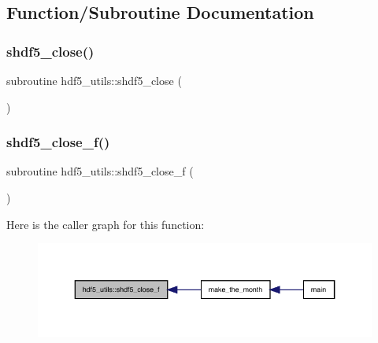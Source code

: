 \subsection{Function/\+Subroutine Documentation}
\mbox{\label{namespacehdf5__utils_ac2a5ad4876fe382625c40cd9964ca3c1}} 
\subsubsection{\texorpdfstring{shdf5\+\_\+close()}{shdf5\_close()}}
{\footnotesize\ttfamily subroutine hdf5\+\_\+utils\+::shdf5\+\_\+close (\begin{DoxyParamCaption}{ }\end{DoxyParamCaption})}

\mbox{\label{namespacehdf5__utils_aced9a0b34d2b1e59a1867be622a7c8a4}} 
\subsubsection{\texorpdfstring{shdf5\+\_\+close\+\_\+f()}{shdf5\_close\_f()}}
{\footnotesize\ttfamily subroutine hdf5\+\_\+utils\+::shdf5\+\_\+close\+\_\+f (\begin{DoxyParamCaption}{ }\end{DoxyParamCaption})}

Here is the caller graph for this function\+:
\nopagebreak
\begin{figure}[H]
\begin{center}
\leavevmode
\includegraphics[width=350pt]{namespacehdf5__utils_aced9a0b34d2b1e59a1867be622a7c8a4_icgraph}
\end{center}
\end{figure}
\mbox{\label{namespacehdf5__utils_a5dbfd8881a533f6a96e2fe24a26b41e7}} 
